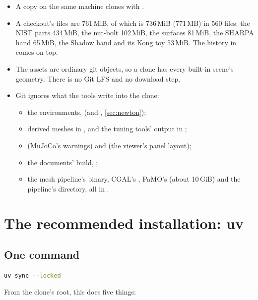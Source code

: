 \begin{itemize}
\item A copy on the same machine clones with .
\item A checkout's files are 761\,MiB, of which  is 736\,MiB (771\,MB) in 560 files: the NIST parts 434\,MiB, the nut-bolt 102\,MiB, the surfaces 81\,MiB, the SHARPA hand 65\,MiB, the Shadow hand and its Kong toy 53\,MiB. The history in  comes on top.
\item The assets are ordinary git objects, so a clone has every built-in scene's geometry. There is no Git LFS and no download step.
\item Git ignores what the tools write into the clone:
  \begin{itemize}
  \item the environments,  (and , \cref{sec:newton});
  \item derived meshes in , and the tuning tools' output in ;
  \item {} (MuJoCo's warnings) and  (the viewer's panel layout);
  \item the documents' build, ;
  \item the mesh pipeline's  binary, CGAL's , PaMO's  (about 10\,GiB) and the pipeline's  directory, all in .
  \end{itemize}
\end{itemize}

\section{The recommended installation: uv}\label{sec:uv}

\subsection{One command}\label{sec:sync}

\begin{lstlisting}[language=bash]
uv sync --locked
\end{lstlisting}

From the clone's root, this does five things:

